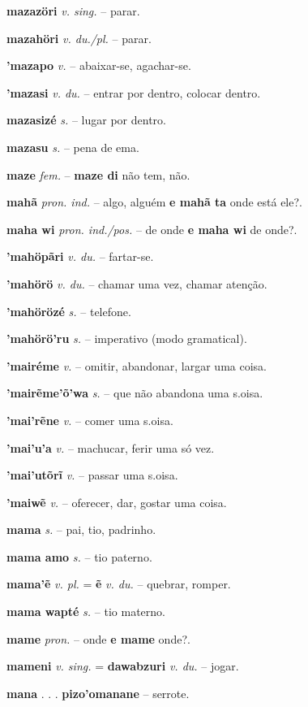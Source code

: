 \textbf{mazazöri} \textit{v. sing.} -- parar.

\textbf{mazahöri} \textit{v. du./pl.} -- parar.

\textbf{'mazapo} \textit{v.} -- abaixar-se, agachar-se.

\textbf{'mazasi} \textit{v. du.} -- entrar por dentro, colocar dentro.

\textbf{mazasizé} \textit{s.} -- lugar por dentro.

\textbf{mazasu} \textit{s.} -- pena de ema.

\textbf{maze} \textit{fem.} -- \textbf{maze di} não tem, não.

\textbf{mahã} \textit{pron. ind.} -- algo, alguém  \textbf{e mahã ta} onde está ele?.

\textbf{maha wi} \textit{pron. ind./pos.} -- de onde  \textbf{e maha wi} de onde?.

\textbf{'mahöpãri} \textit{v. du.} -- fartar-se.

\textbf{'mahörö} \textit{v. du.} -- chamar uma vez, chamar atenção.

\textbf{'mahörözé} \textit{s.} -- telefone.

\textbf{'mahörö'ru} \textit{s.} -- imperativo (modo gramatical).

\textbf{'mairéme} \textit{v.} -- omitir, abandonar, largar uma coisa.

\textbf{'mairẽme'õ'wa} \textit{s.} -- que não abandona uma s.oisa.

\textbf{'mai'rẽne} \textit{v.} -- comer uma s.oisa.

\textbf{'mai'u'a} \textit{v.} -- machucar, ferir uma só vez.

\textbf{'mai'utõrĩ} \textit{v.} -- passar uma s.oisa.

\textbf{'maiwẽ} \textit{v.} -- oferecer, dar, gostar uma coisa.

\textbf{mama} \textit{s.} -- pai, tio, padrinho.

\textbf{mama amo} \textit{s.} -- tio paterno.

\textbf{mama'ẽ} \textit{v. pl.} = \textbf{ẽ} \textit{v. du.} -- quebrar, romper.

\textbf{mama wapté} \textit{s.} -- tio materno.

\textbf{mame} \textit{pron.} -- onde  \textbf{e mame} onde?.

\textbf{mameni} \textit{v. sing.} = \textbf{dawabzuri} \textit{v. du.} -- jogar.

\textbf{mana} . . .  \textbf{pizo'omanane} -- serrote.

